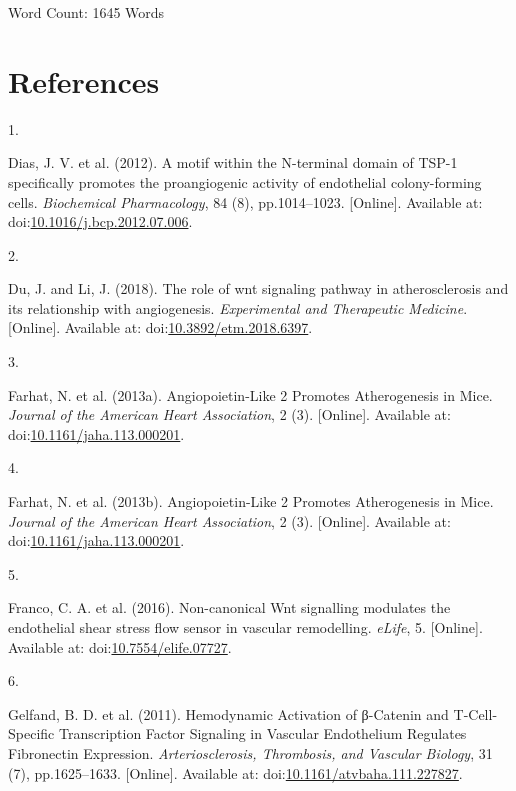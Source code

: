 \documentclass[
  11pt,
]{article}
\newlength{\cslhangindent}
\newlength{\csllabelwidth}
\newlength{\cslentryspacingunit} %
\newenvironment{CSLReferences}[2] %
 {%
  \setlength{\parindent}{0pt}
  \ifodd #1
  \let\oldpar\par
  \def\par{\hangindent=\cslhangindent\oldpar}
  \fi
  \setlength{\parskip}{#2\cslentryspacingunit}
 }%
 {}
\newcommand{\CSLLeftMargin}[1]{\parbox[t]{\csllabelwidth}{#1}}
\newcommand{\CSLRightInline}[1]{\parbox[t]{\linewidth - \csllabelwidth}{#1}\break}
\begin{document}
\begin{flushright}
Word Count: 1645 Words
\end{flushright}

\hypertarget{references}{%
\section{References}\label{references}}

\small

\hypertarget{refs}{}
\begin{CSLReferences}{0}{0}
\leavevmode{}%
\CSLLeftMargin{1. }
\CSLRightInline{Dias, J. V. {et al.} (2012). {A motif within the N-terminal domain of TSP-1 specifically promotes the proangiogenic activity of endothelial colony-forming cells}. \emph{Biochemical Pharmacology}, 84 (8), pp.1014--1023. {[}Online{]}. Available at: doi:\href{https://doi.org/10.1016/j.bcp.2012.07.006}{10.1016/j.bcp.2012.07.006}.}

\leavevmode{}%
\CSLLeftMargin{2. }
\CSLRightInline{Du, J. and Li, J. (2018). {The role of wnt signaling pathway in atherosclerosis and its relationship with angiogenesis}. \emph{Experimental and Therapeutic Medicine}. {[}Online{]}. Available at: doi:\href{https://doi.org/10.3892/etm.2018.6397}{10.3892/etm.2018.6397}.}

\leavevmode{}%
\CSLLeftMargin{3. }
\CSLRightInline{Farhat, N. {et al.} (2013a). {Angiopoietin{-}Like 2 Promotes Atherogenesis in Mice}. \emph{Journal of the American Heart Association}, 2 (3). {[}Online{]}. Available at: doi:\href{https://doi.org/10.1161/jaha.113.000201}{10.1161/jaha.113.000201}.}

\leavevmode{}%
\CSLLeftMargin{4. }
\CSLRightInline{Farhat, N. {et al.} (2013b). {Angiopoietin{-}Like 2 Promotes Atherogenesis in Mice}. \emph{Journal of the American Heart Association}, 2 (3). {[}Online{]}. Available at: doi:\href{https://doi.org/10.1161/jaha.113.000201}{10.1161/jaha.113.000201}.}

\leavevmode{}%
\CSLLeftMargin{5. }
\CSLRightInline{Franco, C. A. {et al.} (2016). {Non-canonical Wnt signalling modulates the endothelial shear stress flow sensor in vascular remodelling}. \emph{eLife}, 5. {[}Online{]}. Available at: doi:\href{https://doi.org/10.7554/elife.07727}{10.7554/elife.07727}.}

\leavevmode{}%
\CSLLeftMargin{6. }
\CSLRightInline{Gelfand, B. D. {et al.} (2011). {Hemodynamic Activation of β-Catenin and T-Cell-Specific Transcription Factor Signaling in Vascular Endothelium Regulates Fibronectin Expression}. \emph{Arteriosclerosis, Thrombosis, and Vascular Biology}, 31 (7), pp.1625--1633. {[}Online{]}. Available at: doi:\href{https://doi.org/10.1161/atvbaha.111.227827}{10.1161/atvbaha.111.227827}.}


\end{CSLReferences}
\end{document}
